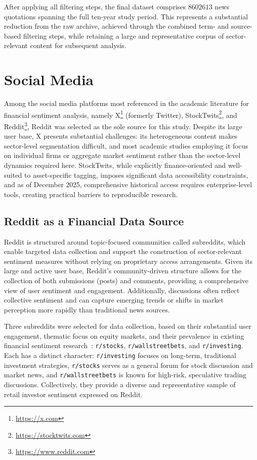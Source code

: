 After applying all filtering steps, the final dataset comprises $\num{8602613}$ news quotations spanning the full ten-year study period. This represents a substantial reduction from the raw archive, achieved through the combined term- and source-based filtering steps, while retaining a large and representative corpus of sector-relevant content for subsequent analysis.


\section{Social Media}
\label{sec:reddit}

Among the social media platforms most referenced in the academic literature for financial sentiment analysis, namely X\footnote{\url{https://x.com}} (formerly Twitter), StockTwits\footnote{\url{https://stocktwits.com}}, and Reddit\footnote{\url{https://www.reddit.com}}, Reddit was selected as the sole source for this study. Despite its large user base, X presents substantial challenges: its heterogeneous content makes sector-level segmentation difficult, and most academic studies employing it focus on individual firms or aggregate market sentiment rather than the sector-level dynamics required here. StockTwits, while explicitly finance-oriented and well-suited to asset-specific tagging, imposes significant data accessibility constraints, and as of December 2025, comprehensive historical access requires enterprise-level tools, creating practical barriers to reproducible research.

\subsection{Reddit as a Financial Data Source}
\label{subsec:reddit_why}

Reddit is structured around topic-focused communities called subreddits, which enable targeted data collection and support the construction of sector-relevant sentiment measures without relying on proprietary access arrangements. Given its large and active user base, Reddit's community-driven structure allows for the collection of both submissions (posts) and comments, providing a comprehensive view of user sentiment and engagement. Additionally, discussions often reflect collective sentiment and can capture emerging trends or shifts in market perception more rapidly than traditional news sources.

Three subreddits were selected for data collection, based on their substantial user engagement, thematic focus on equity markets, and their prevalence in existing financial sentiment research~\cite{da676, 5530e, cc28c}: \texttt{r/stocks}, \texttt{r/wallstreetbets}, and \texttt{r/investing}. Each has a distinct character: \texttt{r/investing} focuses on long-term, traditional investment strategies, \texttt{r/stocks} serves as a general forum for stock discussion and market news, and \texttt{r/wallstreetbets} is known for high-risk, speculative trading discussions. Collectively, they provide a diverse and representative sample of retail investor sentiment expressed on Reddit.

